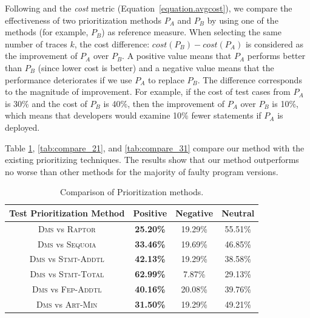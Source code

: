 Following \cite{BaahPH10,BaahPH11} and the {\em cost}
metric (Equation~\ref{equation.avgcost}), we compare
the effectiveness of two prioritization methods $P_A$ and $P_B$ by using
one of the methods (for example, $P_B$) as reference measure.
When selecting the same number of traces $k$, the cost difference:
$cost(P_B) - cost(P_A)$ is considered as the improvement of $P_A$
over $P_B$. A positive value means that $P_A$ performs better than
$P_B$ (since lower cost is better) and a negative value means that the performance deteriorates if we use $P_A$ to replace $P_B$.
The difference corresponds
to the magnitude of improvement. For example, if the cost of
test cases from $P_A$ is 30\% and the cost of $P_B$ is 40\%,
then the improvement of $P_A$ over $P_B$ is 10\%, which means
that developers would examine 10\% fewer statements if $P_A$
is deployed.

\vspace{0.2cm}
 Table \ref{tab:compare_11}, \ref{tab:compare_21}, and \ref{tab:compare_31} compare
our method with the existing prioritizing techniques. The results show that
our method outperforms no worse than other methods for the majority of faulty program versions.

\begin{table}[tbp]
    \centering
		\caption{Comparison of Prioritization methods.}
		\renewcommand{\arraystretch}{1.5}
		\small
        \begin{tabular}{|c|c|c|c|}
			\hline
			Test Prioritization Method  &  Positive  &  Negative  &   Neutral  \\
			\hline\hline
			\textsc{Dms} vs \textsc{Raptor} & {\bf 25.20\%} &    19.29\% &    55.51\% \\
			\hline
			\textsc{Dms} vs \textsc{Sequoia} & {\bf 33.46\%} &    19.69\% &    46.85\% \\
			\hline
			\textsc{Dms} vs \textsc{Stmt-Addtl} & {\bf 42.13\%} &    19.29\% &    38.58\% \\
			\hline
			\textsc{Dms} vs \textsc{Stmt-Total} & {\bf 62.99\%} &     7.87\% &    29.13\% \\
			\hline
			\textsc{Dms} vs \textsc{Fep-Addtl} & {\bf 40.16\%} &    20.08\% &    39.76\% \\
			\hline
			\textsc{Dms} vs \textsc{Art-Min} & {\bf 31.50\%} &    19.29\% &    49.21\% \\
			\hline
		\end{tabular}
    \label{tab:compare_11}
\end{table}

